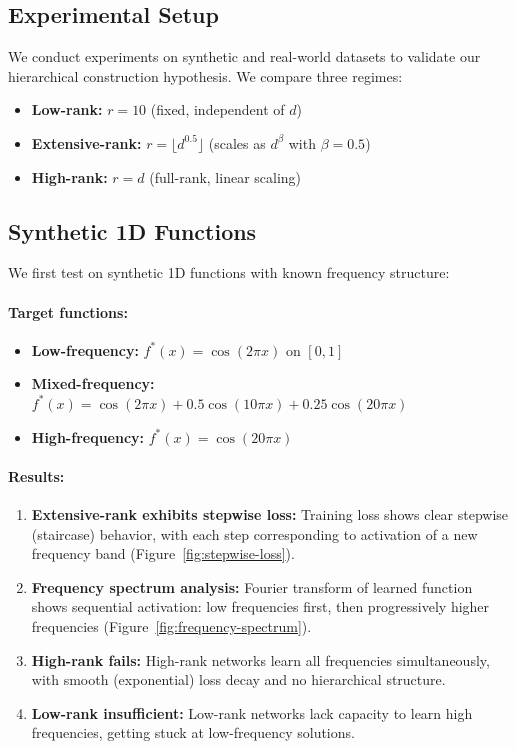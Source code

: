 \subsection{Experimental Setup}

We conduct experiments on synthetic and real-world datasets to validate our hierarchical construction hypothesis. We compare three regimes:
\begin{itemize}
    \item \textbf{Low-rank:} $r = 10$ (fixed, independent of $d$)
    \item \textbf{Extensive-rank:} $r = \lfloor d^{0.5} \rfloor$ (scales as $d^\beta$ with $\beta = 0.5$)
    \item \textbf{High-rank:} $r = d$ (full-rank, linear scaling)
\end{itemize}

\subsection{Synthetic 1D Functions}

We first test on synthetic 1D functions with known frequency structure:

\paragraph{Target functions:}
\begin{itemize}
    \item \textbf{Low-frequency:} $f^*(x) = \cos(2\pi x)$ on $[0, 1]$
    \item \textbf{Mixed-frequency:} $f^*(x) = \cos(2\pi x) + 0.5\cos(10\pi x) + 0.25\cos(20\pi x)$
    \item \textbf{High-frequency:} $f^*(x) = \cos(20\pi x)$
\end{itemize}

\paragraph{Results:}
\begin{enumerate}
    \item \textbf{Extensive-rank exhibits stepwise loss:} Training loss shows clear stepwise (staircase) behavior, with each step corresponding to activation of a new frequency band (Figure~\ref{fig:stepwise-loss}).
    \item \textbf{Frequency spectrum analysis:} Fourier transform of learned function shows sequential activation: low frequencies first, then progressively higher frequencies (Figure~\ref{fig:frequency-spectrum}).
    \item \textbf{High-rank fails:} High-rank networks learn all frequencies simultaneously, with smooth (exponential) loss decay and no hierarchical structure.
    \item \textbf{Low-rank insufficient:} Low-rank networks lack capacity to learn high frequencies, getting stuck at low-frequency solutions.
\end{enumerate}

